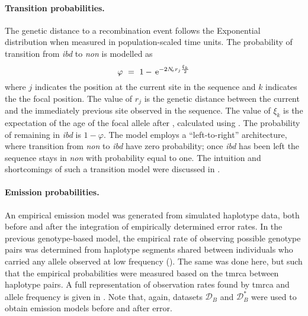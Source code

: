 \paragraph{Transition probabilities.}
The genetic distance to a recombination event follows the Exponential distribution when measured in population-scaled time units.
The probability of transition from \emph{ibd} to \emph{non} is modelled as
\begin{equation}\label{eq:hmm_trans_prob}
	\varphi ~=~
	1 - \,\mathrm{e}^{-2N_{\!e} r_j \frac{\xi_k}{2}}
\end{equation}
where $j$ indicates the position at the current site in the sequence and $k$ indicates the the focal position.
The value of $r_j$ is the genetic distance between the current and the immediately previous site observed in the sequence.
The value of $\xi_k$ is the expectation of the age of the focal allele after \citet{Kimura:1973ug}, calculated using .
The probability of remaining in \emph{ibd} is ${1-\varphi}$.
The model employs a ``left-to-right'' architecture, where transition from \emph{non} to \emph{ibd} have zero probability; \ie once \emph{ibd} has been left the sequence stays in \emph{non} with probability equal to one.
The intuition and shortcomings of such a transition model were discussed in .



\paragraph{Emission probabilities.}
An empirical emission model was generated from simulated haplotype data, both before and after the integration of empirically determined error rates.
In the previous genotype-based model, the empirical rate of observing possible genotype pairs was determined from haplotype segments shared between individuals who carried any allele observed at low frequency (\fk{[2,25]}).
The same was done here, but such that the empirical probabilities were measured based on the \gls{tmrca} between haplotype pairs.
A full representation of observation rates found by \gls{tmrca} and allele frequency is given in .
Note that, again, datasets $\mathcal{D}_B$ and $\mathcal{D}_B^{\ast}$ were used to obtain emission models before and after error.

%

%


